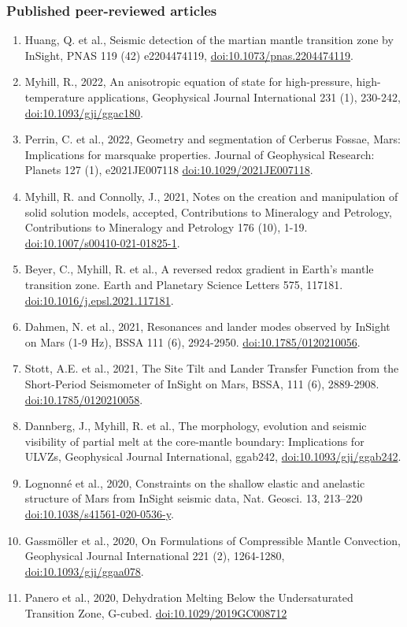 \documentclass[11pt,twoside,a4paper]{article}
\newcommand{\doi}[1]{\href{http://dx.doi.org/#1}{doi:#1}}
\begin{document}
\subsubsection*{Published peer-reviewed articles}
\begin{enumerate}
\item Huang, Q. et al., Seismic detection of the martian mantle transition zone by InSight, PNAS 119 (42) e2204474119, \doi{10.1073/pnas.2204474119}.
\item Myhill, R., 2022, An anisotropic equation of state for high-pressure, high-temperature applications, Geophysical Journal International 231 (1), 230-242, \doi{10.1093/gji/ggac180}.
\item Perrin, C. et al., 2022, Geometry and segmentation of Cerberus Fossae, Mars: Implications for marsquake properties. Journal of Geophysical Research: Planets 127 (1), e2021JE007118 \doi{10.1029/2021JE007118}.
\item Myhill, R. and Connolly, J., 2021, Notes on the creation and manipulation of solid solution models, accepted, Contributions to Mineralogy and Petrology, Contributions to Mineralogy and Petrology 176 (10), 1-19. \doi{10.1007/s00410-021-01825-1}.
\item Beyer, C., Myhill, R. et al., A reversed redox gradient in Earth's mantle transition zone. Earth and Planetary Science Letters 575, 117181. \doi{10.1016/j.epsl.2021.117181}.
\item Dahmen, N. et al., 2021, Resonances and lander modes observed by InSight on Mars (1-9 Hz), BSSA 111 (6), 2924-2950. \doi{10.1785/0120210056}.
\item Stott, A.E. et al., 2021, The Site Tilt and Lander Transfer Function from the Short-Period Seismometer of InSight on Mars, BSSA, 111 (6), 2889-2908. \doi{10.1785/0120210058}.
\item Dannberg, J., Myhill, R. et al., The morphology, evolution and seismic visibility of partial melt at the core-mantle boundary: Implications for ULVZs, Geophysical Journal International, ggab242, \doi{10.1093/gji/ggab242}.
\item Lognonn\'e et al., 2020, Constraints on the shallow elastic and anelastic structure of Mars from InSight seismic data, Nat. Geosci. 13, 213--220 \doi{10.1038/s41561-020-0536-y}.
\item Gassm{\"o}ller et al., 2020, On Formulations of Compressible Mantle Convection, Geophysical Journal International 221 (2), 1264-1280, \doi{10.1093/gji/ggaa078}.
\item Panero et al., 2020, Dehydration Melting Below the Undersaturated Transition Zone, G-cubed. \doi{10.1029/2019GC008712}

\end{enumerate}
\end{document}
